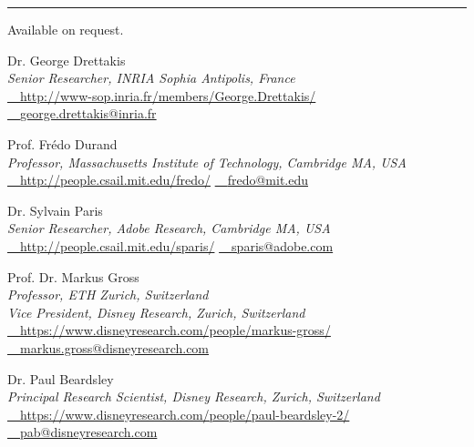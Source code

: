 \documentclass[10pt]{article}
\newcommand*{\sectionstyle}      [1]{{\normalsize \color{Black} \bfseries \scshape \textsf{#1}}}
\newcommand{\cvsection}[1]{\vspace{0.2cm}\hrule\vspace{0.15cm}\sectionstyle{#1}}
\newenvironment{cvitems}{
    \setlength{\leftmargini}{0cm}
    \setlength{\itemindent}{0cm}
    \setlength{\labelsep}{0cm}
    \setlength{\topsep}{0cm}
    \begin{description}
}
{\end{description}}
\newcommand{\mailicon}{{\faEnvelope~~}}
\newcommand{\homeicon}{{\faHome~~}}
\newcommand{\www} [1]{{\href       {#1}{\color{Gray} \homeicon #1}}}
\newcommand{\mail}[1]{{\href{mailto:#1}{\color{Gray} \mailicon #1}}}
\begin{document}
\cvsection{references}
\begin{cvitems}
{%
\item Available on request.
}{%
\item Dr. George Drettakis
    \\ {\itshape Senior Researcher, INRIA Sophia Antipolis, France} \\
\www{http://www-sop.inria.fr/members/George.Drettakis/} \quad
\mail{george.drettakis@inria.fr}
%
\item Prof. Fr{\'e}do Durand
    \\ {\itshape Professor, Massachusetts Institute of Technology, Cambridge MA, USA} \\
\www{http://people.csail.mit.edu/fredo/} \quad
\mail{fredo@mit.edu}
%
\item Dr. Sylvain Paris
    \\ {\itshape Senior Researcher, Adobe Research, Cambridge MA, USA} \\
\www{http://people.csail.mit.edu/sparis/} \quad
\mail{sparis@adobe.com}
%
\item Prof. Dr. Markus Gross
    \\ {\itshape Professor, ETH Zurich, Switzerland}
    \\ {\itshape Vice President, Disney Research, Zurich, Switzerland} \\
\www{https://www.disneyresearch.com/people/markus-gross/} \quad
\mail{markus.gross@disneyresearch.com}
%
\item Dr. Paul Beardsley
    \\ {\itshape Principal Research Scientist, Disney Research, Zurich, Switzerland}\\
\www{https://www.disneyresearch.com/people/paul-beardsley-2/} \quad
\mail{pab@disneyresearch.com}
}
\end{cvitems}
\end{document}
